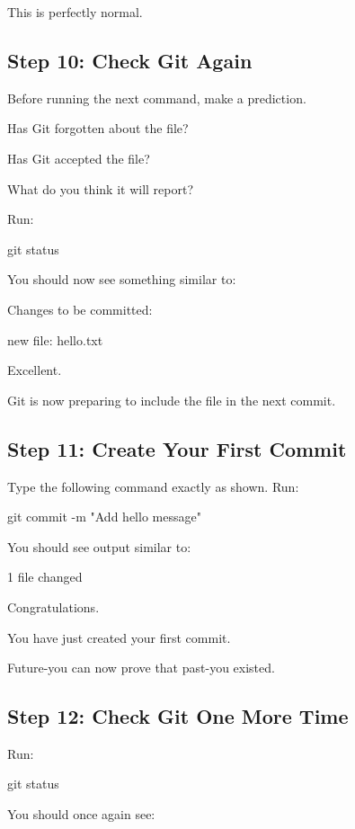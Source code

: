 \documentclass{csc2059practical}
\begin{document}
This is perfectly normal.

\subsection{Step 10: Check Git Again}
Before running the next command, make a prediction.

Has Git forgotten about the file?

Has Git accepted the file?

What do you think it will report?

Run:

\begin{terminalplain}
git status
\end{terminalplain}
You should now see something similar to:

\begin{terminalplain}
Changes to be committed:

\hspace{1cm}\textcolor{GitGreen}{new file: hello.txt}
\end{terminalplain}
Excellent.

Git is now preparing to include the file in the next commit.

\subsection{Step 11: Create Your First Commit}
Type the following command exactly as shown. Run:

\begin{terminalplain}
git commit -m "Add hello message"
\end{terminalplain}
You should see output similar to:

\begin{terminalplain}
1 file changed
\end{terminalplain}
Congratulations.

You have just created your first commit.

Future-you can now prove that past-you existed.

\subsection{Step 12: Check Git One More Time}
Run:

\begin{terminalplain}
git status
\end{terminalplain}
You should once again see:
\end{document}
